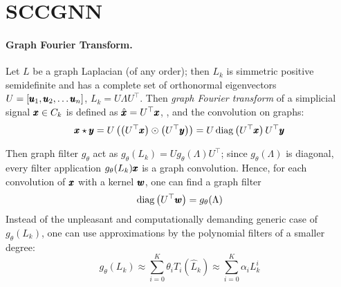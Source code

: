 \documentclass{mynotes}
\begin{document}
\section{ SCCGNN }


\begin{comment}
Let \( C_k \) be a formal linear space on \( \V k \).

We consider a semi-supervised setting\todo{I am not clear on terms: is it semi-supervised if not the dominant share of values is missing?}: we have the flow \( \b x \in C_1 \) with a share of missing values; the goal is to reconstruct the missing values (let \( \nu \) be the share of the missing values; missing entries in \( \b x \) are filled with the median\todo{or \( 0 \)} value of the present values).
\end{comment}

\paragraph{Graph Fourier Transform. }

Let \( L \) be a graph Laplacian (of any order); then \( L_k \) is simmetric positive semidefinite and has a complete set of orthonormal eigenvectors \( U = [ \pmb{u}_1, \pmb{u}_2, \ldots \pmb{u}_n ]\), \( L_k = U \Lambda U^\top \). Then \emph{graph Fourier transform } of a simplicial signal \( \pmb{x} \in C_k \) is defined as \( \hat{ \pmb{x} } = U^\top \pmb{x} \), \cite{kipfSemiSupervisedClassificationGraph2017}, and the convolution on graphs:
\begin{equation}
      \pmb{x} \star \pmb{y} = U \left(  \left( U^\top \pmb{x} \right)  \odot \left( U^\top \pmb{y} \right) \right) = U \operatorname{diag} \left( U^\top \pmb{x} \right) U^\top \pmb{y}
\end{equation}

Then graph filter \( g_\theta \) act as \( g_\theta ( L_k ) = U g_\theta ( \Lambda ) U^\top \); since \( g_\theta ( \Lambda ) \) is diagonal, every filter application \( g_\theta (L_k) \pmb{x} \) is a graph convolution. Hence, for each convolution of \( \pmb{x} \) with a kernel \( \pmb{w} \), one can find a graph filter
\begin{equation}
      \operatorname{diag} \left( U^\top \pmb{w} \right) = g_\theta ( \Lambda )
\end{equation}
Instead of the unpleasant and computationally demanding generic case of \( g_\theta (L_k) \), one can use approximations by the polynomial filters of a smaller degree:
\begin{equation}
      g_\theta (L_k ) \approx \sum_{i=0}^K \theta_i T_i ( \hat L_k ) \approx   \sum_{i=0}^K \alpha_i L_k^i
\end{equation}
\end{document}
